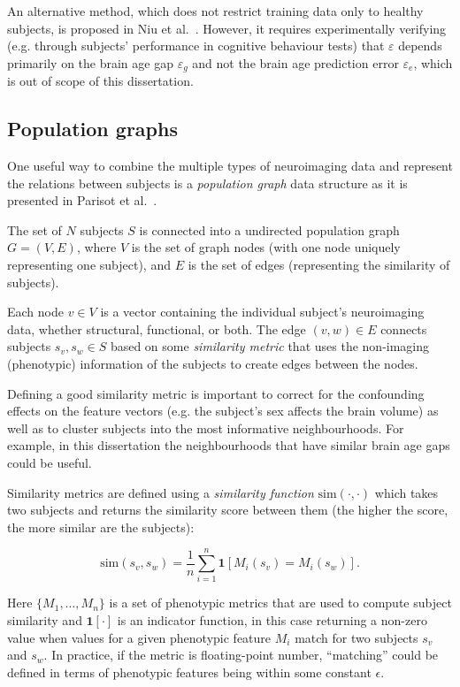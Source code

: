 An alternative method, which does not restrict training data only to healthy subjects, is proposed in Niu et al.~\cite{niu2019improved}. However, it requires experimentally verifying (e.g. through subjects' performance in cognitive behaviour tests) that $\varepsilon$ depends primarily on the brain age gap $\varepsilon_g$ and not the brain age prediction error $\varepsilon_e$, which is out of scope of this dissertation.

\subsection{Population graphs}
\label{population-graphs}

One useful way to combine the multiple types of neuroimaging data and represent the relations between subjects is a \textit{population graph} data structure as it is presented in Parisot et al.~\cite{parisot2018disease}.

The set of $N$ subjects $S$ is connected into a undirected population graph $G = (V, E)$, where $V$ is the set of graph nodes (with one node uniquely representing one subject), and $E$ is the set of edges (representing the similarity of subjects).

Each node $v \in V$ is a vector containing the individual subject's neuroimaging data, whether structural, functional, or both. The edge $(v, w) \in E$ connects subjects $s_v, s_w \in S$ based on some \textit{similarity metric} that uses the non-imaging (phenotypic) information of the subjects to create edges between the nodes. 

Defining a good similarity metric is important to correct for the confounding effects on the feature vectors (e.g. the subject's sex affects the brain volume) as well as to cluster subjects into the most informative neighbourhoods. For example, in this dissertation the neighbourhoods that have similar brain age gaps could be useful.

Similarity metrics are defined using a \textit{similarity function} $\mathrm{sim}(\cdot, \cdot)$ which takes two subjects and returns the similarity score between them (the higher the score, the more similar are the subjects):

\begin{equation}
    \mathrm{sim}(s_v, s_w) = \frac{1}{n}\sum_{i=1}^{n} \mathbf{1}[M_i(s_v) = M_i(s_w)].
\end{equation}

Here $\{M_1, \dots, M_n\}$ is a set of phenotypic metrics that are used to compute subject similarity and $\mathbf{1}[\cdot]$ is an indicator function, in this case returning a non-zero value when values for a given phenotypic feature $M_i$ match for two subjects $s_v$ and $s_w$. In practice, if the metric is floating-point number, ``matching'' could be defined in terms of phenotypic features being within some constant $\epsilon$. 

